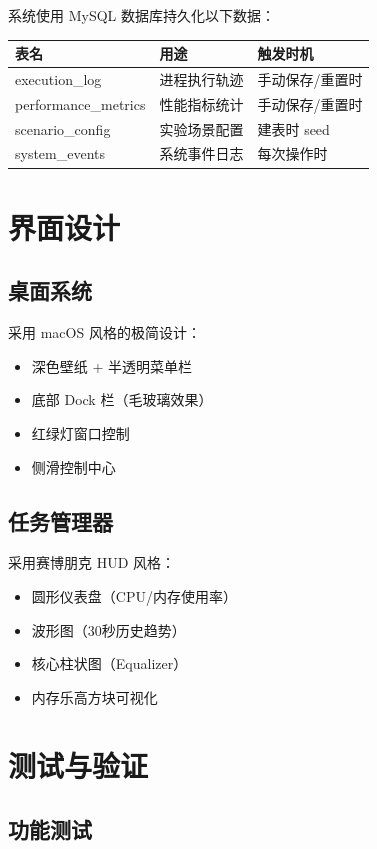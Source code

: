 \documentclass[12pt,a4paper]{article}
\begin{document}
系统使用 MySQL 数据库持久化以下数据：

\begin{table}[H]
\centering
\begin{tabular}{lll}
\toprule
\textbf{表名} & \textbf{用途} & \textbf{触发时机} \\
\midrule
execution\_log & 进程执行轨迹 & 手动保存/重置时 \\
performance\_metrics & 性能指标统计 & 手动保存/重置时 \\
scenario\_config & 实验场景配置 & 建表时 seed \\
system\_events & 系统事件日志 & 每次操作时 \\
\bottomrule
\end{tabular}
\end{table}

\section{界面设计}

\subsection{桌面系统}
采用 macOS 风格的极简设计：
\begin{itemize}
    \item 深色壁纸 + 半透明菜单栏
    \item 底部 Dock 栏（毛玻璃效果）
    \item 红绿灯窗口控制
    \item 侧滑控制中心
\end{itemize}

\subsection{任务管理器}
采用赛博朋克 HUD 风格：
\begin{itemize}
    \item 圆形仪表盘（CPU/内存使用率）
    \item 波形图（30秒历史趋势）
    \item 核心柱状图（Equalizer）
    \item 内存乐高方块可视化
\end{itemize}

\section{测试与验证}

\subsection{功能测试}
\end{document}
